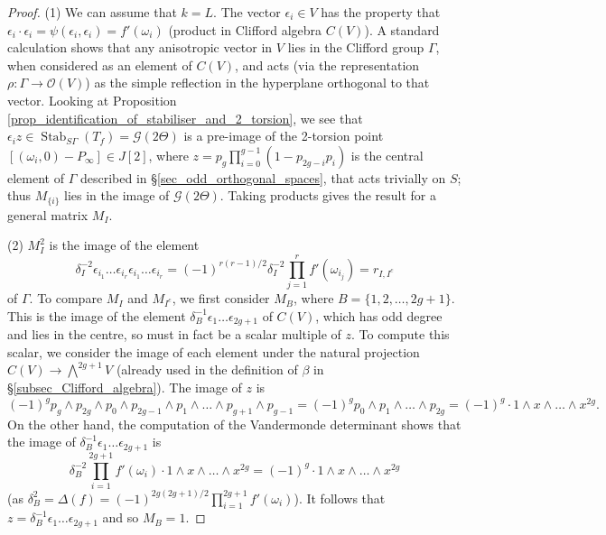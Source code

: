 \documentclass{article} %
\numberwithin{equation}{section}
\DeclareMathOperator{\Stab}{Stab}
\renewcommand{\O}{\mathcal{O}}
\begin{document}
\begin{proof}
    (1) We can assume that $k = L$. The vector $\epsilon_i \in V$ has the property that $\epsilon_i \cdot \epsilon_i = \psi(\epsilon_i, \epsilon_i) = f'(\omega_i)$ (product in  Clifford algebra $C(V)$). A standard calculation shows that any anisotropic vector in $V$ lies in the Clifford group $\Gamma$, when considered as an element of $C(V)$, and acts (via the representation $\rho : \Gamma \to \O(V)$) as the simple reflection in the hyperplane orthogonal to that vector. Looking at Proposition \ref{prop_identification_of_stabiliser_and_2_torsion}, we see that $\epsilon_i z \in \Stab_{S \Gamma}(T_f) = \mathcal{G}(2\Theta)$ is a pre-image of the 2-torsion point $[(\omega_i, 0) - P_\infty] \in J[2]$, where $z = p_g \prod_{i=0}^{g-1} (1 - p_{2g-i} p_i)$ is the central element of $\Gamma$ described in \S \ref{sec_odd_orthogonal_spaces}, that acts trivially on $S$; thus $M_{ \{ i \} }$ lies in the image of $\mathcal{G}(2\Theta)$. Taking products gives the result for a general matrix $M_I$. 

    (2) $M_I^2$ is the image of the element
    \[ \delta_I^{-2} \epsilon_{i_1} \dots \epsilon_{i_r} \epsilon_{i_1} \dots \epsilon_{i_r} = (-1)^{r(r-1)/2} \delta_I^{-2} \prod_{j=1}^r f'(\omega_{i_j}) = r_{I, I^c} \]
    of $\Gamma$.
    To compare $M_I$ and $M_{I^c}$, we first consider $M_B$, where $B = \{ 1, 2, \dots, 2g+1 \}$. This is the image of the element $\delta_B^{-1} \epsilon_1 \dots \epsilon_{2g+1}$ of $C(V)$, which has  odd degree and lies in the centre, so must in fact be a scalar multiple of $z$. To compute this scalar, we consider the image of each element under the natural projection $C(V) \to \bigwedge^{2g+1} V$ (already used in the  definition of $\beta$ in \S \ref{subsec_Clifford_algebra}). The image of $z$ is
    \[ (-1)^g p_g \wedge p_{2g} \wedge p_0 \wedge p_{2g-1} \wedge  p_1 \wedge \dots \wedge  p_{g+1} \wedge p_{g-1} = (-1)^g p_0 \wedge p_1 \wedge \dots \wedge p_{2g} = (-1)^g \cdot 1 \wedge x \wedge \dots \wedge x^{2g}.  \]
    On the other hand, the computation of the Vandermonde determinant shows that
    the image of $\delta_B^{-1} \epsilon_1 \dots \epsilon_{2g+1}$ is
    \[ \delta_B^{-2} \prod_{i=1}^{2g+1} f'(\omega_i) \cdot 1 \wedge x \wedge \dots \wedge x^{2g} = (-1)^g \cdot 1 \wedge x \wedge \dots \wedge x^{2g} \]
    (as $\delta_B^2 = \Delta(f) = (-1)^{2g(2g+1)/2} \prod_{i=1}^{2g+1} f'(\omega_i)$). It follows that $z = \delta_B^{-1} \epsilon_1 \dots \epsilon_{2g+1}$ and so $M_B = 1$.
    

\end{proof}
\end{document}

